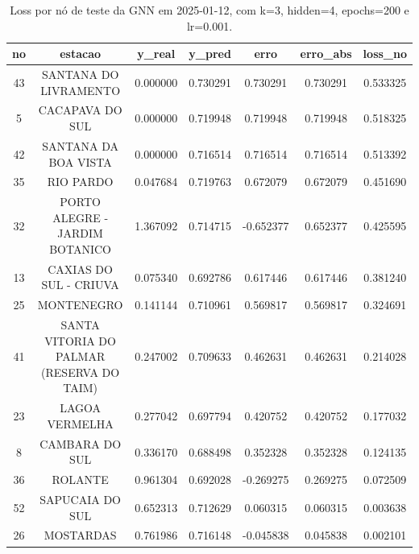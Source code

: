 \begin{table}[h]
\centering
\caption{Loss por nó de teste da GNN em 2025-01-12, com k=3, hidden=4, epochs=200 e lr=0.001.}
\label{tab:gnn_loss_nodes_k3_hidden4}
\begin{tabular}{ccccccc}
\toprule
no & estacao & y\_real & y\_pred & erro & erro\_abs & loss\_no \\
\midrule
43 & SANTANA DO LIVRAMENTO & 0.000000 & 0.730291 & 0.730291 & 0.730291 & 0.533325 \\
5 & CACAPAVA DO SUL & 0.000000 & 0.719948 & 0.719948 & 0.719948 & 0.518325 \\
42 & SANTANA DA BOA VISTA & 0.000000 & 0.716514 & 0.716514 & 0.716514 & 0.513392 \\
35 & RIO PARDO & 0.047684 & 0.719763 & 0.672079 & 0.672079 & 0.451690 \\
32 & PORTO ALEGRE - JARDIM BOTANICO & 1.367092 & 0.714715 & -0.652377 & 0.652377 & 0.425595 \\
13 & CAXIAS DO SUL - CRIUVA & 0.075340 & 0.692786 & 0.617446 & 0.617446 & 0.381240 \\
25 & MONTENEGRO & 0.141144 & 0.710961 & 0.569817 & 0.569817 & 0.324691 \\
41 & SANTA VITORIA DO PALMAR (RESERVA DO TAIM) & 0.247002 & 0.709633 & 0.462631 & 0.462631 & 0.214028 \\
23 & LAGOA VERMELHA & 0.277042 & 0.697794 & 0.420752 & 0.420752 & 0.177032 \\
8 & CAMBARA DO SUL & 0.336170 & 0.688498 & 0.352328 & 0.352328 & 0.124135 \\
36 & ROLANTE & 0.961304 & 0.692028 & -0.269275 & 0.269275 & 0.072509 \\
52 & SAPUCAIA DO SUL & 0.652313 & 0.712629 & 0.060315 & 0.060315 & 0.003638 \\
26 & MOSTARDAS & 0.761986 & 0.716148 & -0.045838 & 0.045838 & 0.002101 \\
\bottomrule
\end{tabular}
\end{table}
